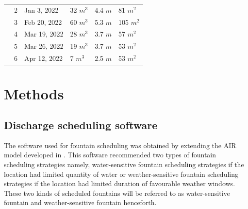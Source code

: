 \documentclass[tc, manuscript]{copernicus}
\begin{document}
\begin{table}
\begin{tabular}{@{}|llllll|@{}}
		\multicolumn{1}{|l|}{} & 2            & Jan 3, 2022   & 32 $m^{3}$      & 4.4 $m$
		                       & 81 $m^{2}$                                                                       \\
		\multicolumn{1}{|l|}{} & 3            & Feb 20, 2022   & 60 $m^{3}$      & 5.3 $m$
		                       & 105 $m^{2}$                                                                       \\
		\multicolumn{1}{|l|}{} & 4            & Mar 19, 2022   & 28 $m^{3}$      & 3.7 $m$
		                       & 57 $m^{2}$                                                                       \\
		\multicolumn{1}{|l|}{} & 5            & Mar 26, 2022   & 19 $m^{3}$      & 3.7 $m$
		                       & 53 $m^{2}$                                                                       \\
		\multicolumn{1}{|l|}{} & 6            & Apr 12, 2022   & 7 $m^{3}$      & 2.5 $m$
		                       & 53 $m^{2}$                                                                       \\
		\bottomrule
	\end{tabular}

\end{table}

\section{Methods}

\subsection{Discharge scheduling software}

The software used for fountain scheduling was obtained by extending the AIR model developed in
\cite{balasubramanianInfluenceMeteorologicalConditions2022}. This software recommended two types of fountain
scheduling strategies namely, water-sensitive fountain scheduling strategies if the location had limited
quantity of water or weather-sensitive fountain scheduling strategies if the location had limited duration of
favourable weather windows. These two kinds of scheduled fountains will be referred to as water-sensitive
fountain and weather-sensitive fountain henceforth.
\end{document}

